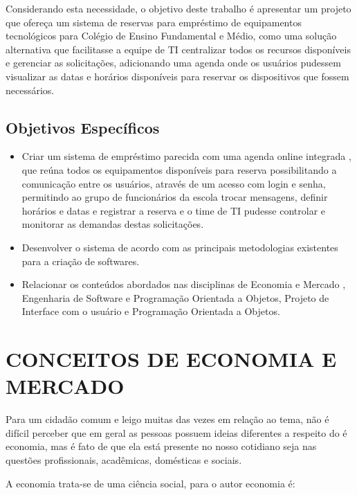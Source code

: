 \documentclass[
12pt,				%
oneside,			%
a4paper,			%
section=TITLE,
brazil,				%
]{abntex2}
\let\oldsection\section
\renewcommand\section{\clearpage\oldsection}
\begin{document}
  Considerando esta necessidade, o objetivo deste trabalho é apresentar um
  projeto que ofereça um sistema de reservas para empréstimo de equipamentos
  tecnológicos para Colégio de Ensino Fundamental e Médio, como uma solução
  alternativa que facilitasse a equipe de TI centralizar todos os recursos
  disponíveis e gerenciar as solicitações, adicionando uma agenda onde os
  usuários pudessem visualizar as datas e horários disponíveis para reservar os
  dispositivos que fossem necessários.

  \subsection{Objetivos Específicos}

  \begin{itemize}
    \item Criar um sistema de empréstimo parecida com uma agenda online integrada
      , que reúna todos os equipamentos disponíveis para reserva possibilitando a
      comunicação entre os usuários, através de um acesso com login e senha,
      permitindo ao grupo de funcionários da escola trocar mensagens, definir
      horários e datas e registrar a reserva e o time de TI pudesse controlar e
      monitorar as demandas destas solicitações.

    \item Desenvolver o sistema de acordo com as principais metodologias
      existentes para a criação de softwares.

    \item Relacionar os conteúdos abordados nas disciplinas de Economia e Mercado
      , Engenharia de Software e Programação Orientada a Objetos, Projeto de
      Interface com o usuário e Programação Orientada a Objetos.
  \end{itemize}

  \section{CONCEITOS DE ECONOMIA E MERCADO}

  Para um cidadão comum e leigo muitas das vezes em relação ao tema, não é
  difícil perceber que em geral as pessoas possuem ideias diferentes a respeito
  do é economia, mas é fato de que ela está presente no nosso cotidiano seja nas
  questões profissionais, acadêmicas, domésticas e sociais.

  A economia trata-se de uma ciência social, para o autor\cite[p.15]{de2006economia} economia é:
\end{document}
